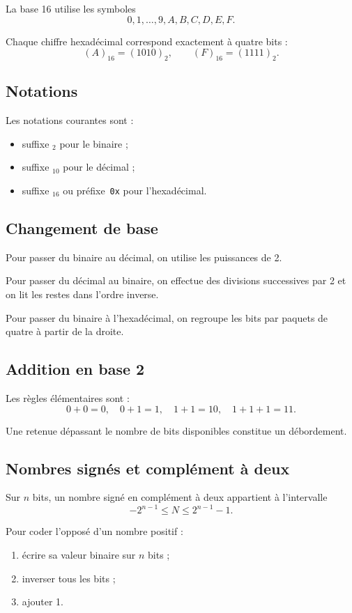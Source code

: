 La base 16 utilise les symboles
\[
0,1,\ldots,9,A,B,C,D,E,F.
\]

Chaque chiffre hexadécimal correspond exactement à quatre bits :
\[
(A)_{16}=(1010)_2,
\qquad
(F)_{16}=(1111)_2.
\]

\subsection{Notations}

Les notations courantes sont :
\begin{itemize}
  \item suffixe $_2$ pour le binaire ;
  \item suffixe $_{10}$ pour le décimal ;
  \item suffixe $_{16}$ ou préfixe \,\texttt{0x} pour l'hexadécimal.
\end{itemize}

\subsection{Changement de base}

Pour passer du binaire au décimal, on utilise les puissances de 2.

Pour passer du décimal au binaire, on effectue des divisions successives par 2 et on lit les restes dans l'ordre inverse.

Pour passer du binaire à l'hexadécimal, on regroupe les bits par paquets de quatre à partir de la droite.

\subsection{Addition en base 2}

Les règles élémentaires sont :
\[
0+0=0,
\quad
0+1=1,
\quad
1+1=10,
\quad
1+1+1=11.
\]

Une retenue dépassant le nombre de bits disponibles constitue un débordement.

\subsection{Nombres signés et complément à deux}

Sur $n$ bits, un nombre signé en complément à deux appartient à l'intervalle
\[
-2^{n-1}\leq N\leq 2^{n-1}-1.
\]

Pour coder l'opposé d'un nombre positif :
\begin{enumerate}
  \item écrire sa valeur binaire sur $n$ bits ;
  \item inverser tous les bits ;
  \item ajouter 1.
\end{enumerate}

